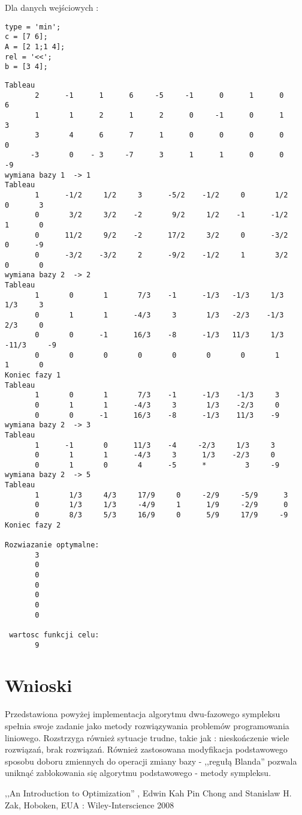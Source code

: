 \documentclass{classrep}
\begin{document}
Dla danych wejściowych :


\begin{Verbatim}[frame=lines]
type = 'min';
c = [7 6];
A = [2 1;1 4];
rel = '<<';
b = [3 4];
\end{Verbatim}

\begin{Verbatim}[frame=lines]
Tableau
       2      -1      1      6     -5     -1      0      1      0      6 
       1       1      2      1      2      0     -1      0      1      3
       3       4      6      7      1      0      0      0      0      0
      -3       0    - 3     -7      3      1      1      0      0     -9 
wymiana bazy 1  -> 1
Tableau
       1      -1/2     1/2     3      -5/2    -1/2     0       1/2     0       3
       0       3/2     3/2    -2       9/2     1/2    -1      -1/2     1       0
       0      11/2     9/2    -2      17/2     3/2     0      -3/2     0      -9
       0      -3/2    -3/2     2      -9/2    -1/2     1       3/2     0       0
wymiana bazy 2  -> 2
Tableau
       1       0       1       7/3    -1      -1/3   -1/3     1/3     1/3     3
       0       1       1      -4/3     3       1/3   -2/3    -1/3     2/3     0
       0       0      -1      16/3    -8      -1/3   11/3     1/3   -11/3     -9
       0       0       0       0       0       0       0       1       1       0
Koniec fazy 1
Tableau
       1       0       1       7/3    -1      -1/3    -1/3     3       
       0       1       1      -4/3     3       1/3    -2/3     0       
       0       0      -1      16/3    -8      -1/3    11/3    -9       
wymiana bazy 2  -> 3
Tableau
       1      -1       0      11/3    -4     -2/3     1/3     3       
       0       1       1      -4/3     3      1/3    -2/3     0       
       0       1       0       4      -5      *         3	  -9       
wymiana bazy 2  -> 5
Tableau
       1       1/3     4/3     17/9     0     -2/9     -5/9      3       
       0       1/3     1/3     -4/9     1      1/9     -2/9      0       
       0       8/3     5/3     16/9     0      5/9     17/9     -9       
Koniec fazy 2

Rozwiazanie optymalne:
       3       
       0       
       0       
       0       
       0       
       0       
       0       

 wartosc funkcji celu:
       9    
\end{Verbatim}

\section{Wnioski}
Przedstawiona powyżej implementacja algorytmu dwu-fazowego sympleksu spełnia swoje zadanie jako metody rozwiązywania problemów programowania liniowego. Rozstrzyga również sytuacje trudne, takie jak : nieskończenie wiele rozwiązań, brak rozwiązań. Również zastosowana modyfikacja podstawowego sposobu doboru zmiennych do operacji zmiany bazy - ,,regułą Blanda'' pozwala uniknąć zablokowania się algorytmu podstawowego - metody sympleksu.

\begin{thebibliography}{9}
 ,,An Introduction to Optimization'' , Edwin Kah Pin Chong and Stanislaw H. Zak, Hoboken, EUA : Wiley-Interscience 2008
\end{thebibliography}
\end{document}
